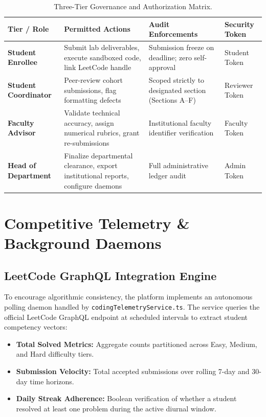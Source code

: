 \documentclass[12pt,a4paper]{report}
\begin{document}
\begin{table}[htbp]
\centering
\small
\begin{tabularx}{\linewidth}{>{\raggedright\arraybackslash\bfseries}p{2.0cm}>{\raggedright\arraybackslash}X>{\raggedright\arraybackslash}X>{\raggedright\arraybackslash}p{1.9cm}}
\toprule
Tier / Role & Permitted Actions & Audit Enforcements & Security Token \\
\midrule
Student Enrollee & Submit lab deliverables, execute sandboxed code, link LeetCode handle & Submission freeze on deadline; zero self-approval & Student Token \\
\addlinespace
Student Coordinator & Peer-review cohort submissions, flag formatting defects & Scoped strictly to designated section (Sections A--F) & Reviewer Token \\
\addlinespace
Faculty Advisor & Validate technical accuracy, assign numerical rubrics, grant re-submissions & Institutional faculty identifier verification & Faculty Token \\
\addlinespace
Head of Department & Finalize departmental clearance, export institutional reports, configure daemons & Full administrative ledger audit & Admin Token \\
\bottomrule
\end{tabularx}
\caption{Three-Tier Governance and Authorization Matrix.}
\label{tab:rbac_vault}
\end{table}

\chapter{Competitive Telemetry \& Background Daemons}

\section{LeetCode GraphQL Integration Engine}
To encourage algorithmic consistency, the platform implements an autonomous polling daemon handled by \texttt{codingTelemetryService.ts}. The service queries the official LeetCode GraphQL endpoint at scheduled intervals to extract student competency vectors:
\begin{itemize}[nosep]
    \item \textbf{Total Solved Metrics:} Aggregate counts partitioned across Easy, Medium, and Hard difficulty tiers.
    \item \textbf{Submission Velocity:} Total accepted submissions over rolling 7-day and 30-day time horizons.
    \item \textbf{Daily Streak Adherence:} Boolean verification of whether a student resolved at least one problem during the active diurnal window.
\end{itemize}
\end{document}
